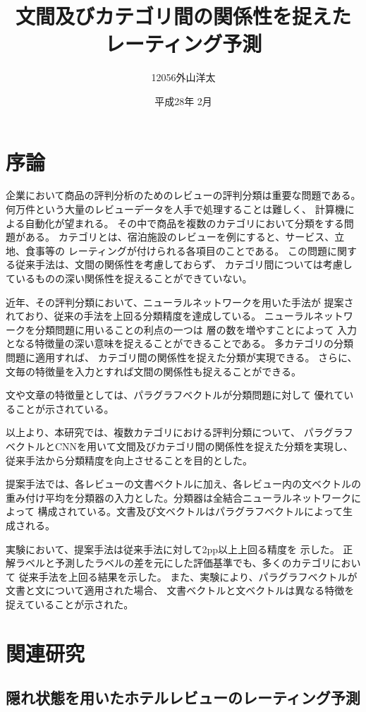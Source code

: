 \documentclass{ttithesis}
\title{文間及びカテゴリ間の関係性を捉えた\\レーティング予測}
\author{12056\hspace{16ex}外山洋太}
\date{平成28年 2月}
\begin{document}
\section{序論}

企業において商品の評判分析のためのレビューの評判分類は重要な問題である。
何万件という大量のレビューデータを人手で処理することは難しく、
計算機による自動化が望まれる。
その中で商品を複数のカテゴリにおいて分類をする問題がある。
カテゴリとは、宿泊施設のレビューを例にすると、サービス、立地、食事等の
レーティングが付けられる各項目のことである。
この問題に関する従来手法\cite{fujitani15}は、文間の関係性を考慮しておらず、
カテゴリ間については考慮しているものの深い関係性を捉えることができていない。

近年、その評判分類において、ニューラルネットワークを用いた手法が
提案されており、従来の手法を上回る分類精度を達成している。
ニューラルネットワークを分類問題に用いることの利点の一つは
層の数を増やすことによって
入力となる特徴量の深い意味を捉えることができることである。
多カテゴリの分類問題に適用すれば、
カテゴリ間の関係性を捉えた分類が実現できる。
さらに、文毎の特徴量を入力とすれば文間の関係性も捉えることができる。

文や文章の特徴量としては、パラグラフベクトル\cite{quoc14}が分類問題に対して
優れていることが示されている。

以上より、本研究では、複数カテゴリにおける評判分類について、
パラグラフベクトルとCNNを用いて文間及びカテゴリ間の関係性を捉えた分類を実現し、
従来手法から分類精度を向上させることを目的とした。

提案手法では、各レビューの文書ベクトルに加え、各レビュー内の文ベクトルの
重み付け平均を分類器の入力とした。分類器は全結合ニューラルネットワークによって
構成されている。文書及び文ベクトルはパラグラフベクトルによって生成される。

実験において、提案手法は従来手法\cite{fujitani15}に対して2pp以上上回る精度を
示した。
正解ラベルと予測したラベルの差を元にした評価基準でも、多くのカテゴリにおいて
従来手法\cite{fujitani15}を上回る結果を示した。
また、実験により、パラグラフベクトルが文書と文について適用された場合、
文書ベクトルと文ベクトルは異なる特徴を捉えていることが示された。



\section{関連研究}

\subsection{隠れ状態を用いたホテルレビューのレーティング予測}
\end{document}
